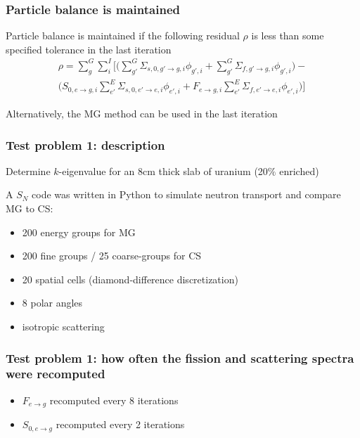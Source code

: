 \documentclass[xcolor=dvipsnames]{beamer}
\newlength{\wideitemsep}
\let\olditem\item
\renewcommand{\item}{\setlength{\itemsep}{\wideitemsep}\olditem}
\begin{document}
\begin{frame}
\frametitle{Particle balance is maintained}
Particle balance is maintained if the following residual $\rho$ is less than some specified tolerance in the last iteration 
\begin{multline*}
\label{eq:scatter}
\rho = \sum_{g}^G \sum_{i}^I \Big[ \Big( \sum_{g'}^G \Sigma_{s,0,g'\to g,i} \phi_{g',i} + \sum_{g'}^G \Sigma_{f,g' \to g,i} \phi_{g',i} \Big) - \\  \Big( S_{0,e\to g,i} \sum_{e'}^E \Sigma_{s,0,e'\to e,i} \phi_{e',i} + F_{e\to g,i} \sum_{e'}^E  \Sigma_{f,e' \to e,i} \phi_{e',i} \Big) \Big]
\end{multline*}

\vspace{0.5cm}

Alternatively, the MG method can be used in the last iteration

\end{frame}

\begin{frame}
  \frametitle{Test problem 1: description}
Determine $k$-eigenvalue for an 8cm thick slab of uranium (20$\%$ enriched)

\vspace{0.5cm}

A $S_N$ code was written in Python to simulate neutron transport and compare MG to CS:
\begin{itemize}
\item 200 energy groups for MG 
\item 200 fine groups / 25 coarse-groups for CS  
\item 20 spatial cells (diamond-difference discretization)
\item 8 polar angles
\item isotropic scattering
\end{itemize}
\end{frame}

\begin{frame}
  \frametitle{Test problem 1: how often the fission and scattering spectra were recomputed}
\begin{itemize}
\item $F_{e \to g}$ recomputed every 8 iterations
\item $S_{0,e \to g}$ recomputed every 2 iterations
\end{itemize}
\end{frame}
\end{document}

